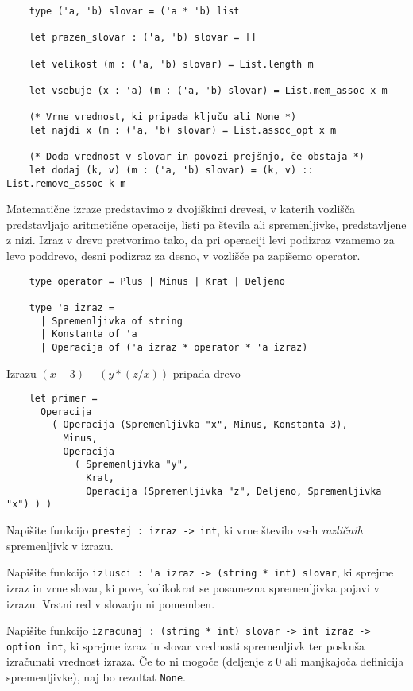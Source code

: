 \documentclass[arhiv]{../izpit}
\begin{document}
\begin{verbatim}
    type ('a, 'b) slovar = ('a * 'b) list

    let prazen_slovar : ('a, 'b) slovar = []
    
    let velikost (m : ('a, 'b) slovar) = List.length m
    
    let vsebuje (x : 'a) (m : ('a, 'b) slovar) = List.mem_assoc x m
    
    (* Vrne vrednost, ki pripada ključu ali None *)
    let najdi x (m : ('a, 'b) slovar) = List.assoc_opt x m
    
    (* Doda vrednost v slovar in povozi prejšnjo, če obstaja *)
    let dodaj (k, v) (m : ('a, 'b) slovar) = (k, v) :: List.remove_assoc k m
\end{verbatim}
  
Matematične izraze predstavimo z dvojiškimi drevesi, v katerih vozlišča predstavljajo aritmetične operacije, listi pa števila ali spremenljivke, predstavljene z nizi.
Izraz v drevo pretvorimo tako, da pri operaciji levi podizraz vzamemo za levo poddrevo, desni podizraz za desno, v vozlišče pa zapišemo operator.
\begin{verbatim}
    type operator = Plus | Minus | Krat | Deljeno

    type 'a izraz =
      | Spremenljivka of string
      | Konstanta of 'a
      | Operacija of ('a izraz * operator * 'a izraz)
\end{verbatim}	
Izrazu $(x - 3) - (y * (z  / x))$ pripada drevo
\begin{verbatim}
    let primer =
      Operacija
        ( Operacija (Spremenljivka "x", Minus, Konstanta 3),
          Minus,
          Operacija
            ( Spremenljivka "y",
              Krat,
              Operacija (Spremenljivka "z", Deljeno, Spremenljivka "x") ) )
\end{verbatim}

\podnaloga Napišite funkcijo \verb|prestej : izraz -> int|, ki vrne število vseh \emph{različnih} spremenljivk v izrazu.

\podnaloga Napišite funkcijo \verb|izlusci : 'a izraz -> (string * int) slovar|, ki sprejme izraz in vrne slovar, ki pove, kolikokrat se posamezna spremenljivka pojavi v izrazu. Vrstni red v slovarju ni pomemben.

\podnaloga Napišite funkcijo \verb|izracunaj : (string * int) slovar -> int izraz -> option int|, ki sprejme izraz in slovar vrednosti spremenljivk ter poskuša izračunati vrednost izraza. Če to ni mogoče (deljenje z 0 ali manjkajoča definicija spremenljivke), naj bo rezultat \verb|None|. 
\end{document}
